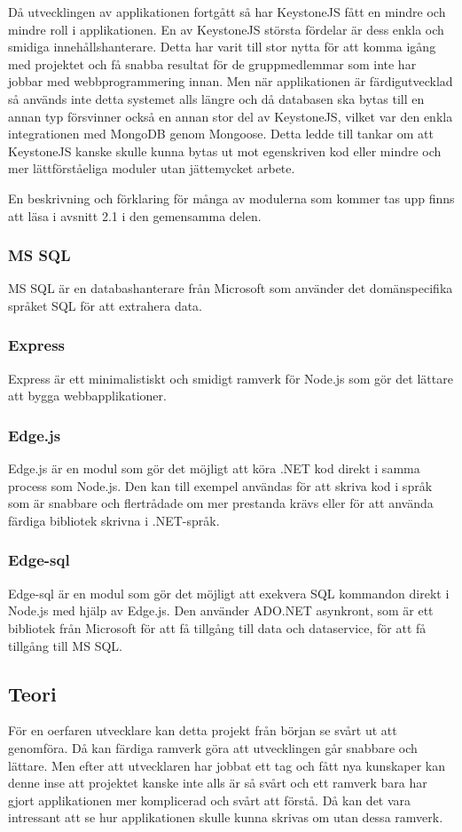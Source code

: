 Då utvecklingen av applikationen fortgått så har KeystoneJS fått en mindre och mindre roll i applikationen. En av KeystoneJS största fördelar är dess enkla och smidiga innehållshanterare. Detta har varit till stor nytta för att komma igång med projektet och få snabba resultat för de gruppmedlemmar som inte har jobbar med webbprogrammering innan. Men när applikationen är färdigutvecklad så används inte detta systemet alls längre och då databasen ska bytas till en annan typ försvinner också en annan stor del av KeystoneJS, vilket var den enkla integrationen med MongoDB genom Mongoose. Detta ledde till tankar om att KeystoneJS kanske skulle kunna bytas ut mot egenskriven kod eller mindre och mer lättförståeliga moduler utan jättemycket arbete.

En beskrivning och förklaring för många av modulerna som kommer tas upp finns att läsa i avsnitt 2.1 i den gemensamma delen.
\subsubsection{MS SQL}
MS SQL är en databashanterare från Microsoft som använder det domänspecifika språket SQL för att extrahera data.

\subsubsection{Express}
Express är ett minimalistiskt och smidigt ramverk för Node.js som gör det lättare att bygga webbapplikationer.

\subsubsection{Edge.js}
Edge.js är en modul som gör det möjligt att köra .NET kod direkt i samma process som Node.js. Den kan till exempel användas för att skriva kod i språk som är snabbare och flertrådade om mer prestanda krävs eller för att använda färdiga bibliotek skrivna i .NET-språk.  

\subsubsection{Edge-sql}
Edge-sql är en modul som gör det möjligt att exekvera SQL kommandon direkt i Node.js med hjälp av Edge.js. Den använder ADO.NET asynkront, som är ett bibliotek från Microsoft för att få tillgång till data och dataservice, för att få tillgång till MS SQL. 

\subsection{Teori}
För en oerfaren utvecklare kan detta projekt från början se svårt ut att genomföra. Då kan färdiga ramverk göra att utvecklingen går snabbare och lättare. Men efter att utvecklaren har jobbat ett tag och fått nya kunskaper kan denne inse att projektet kanske inte alls är så svårt och ett ramverk bara har gjort applikationen mer komplicerad och svårt att förstå. Då kan det vara intressant att se hur applikationen skulle kunna skrivas om utan dessa ramverk. 

